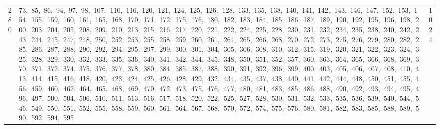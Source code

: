 \begin{longtable}{c|p{}|r}
280 & 73,\ 85,\ 86,\ 94,\ 97,\ 98,\ 107,\ 110,\ 116,\ 120,\ 121,\ 124,\ 125,\ 126,\ 128,\ 133,\ 135,\ 138,\ 140,\ 141,\ 142,\ 143,\ 146,\ 147,\ 152,\ 153,\ 154,\ 155,\ 159,\ 160,\ 161,\ 165,\ 168,\ 170,\ 171,\ 172,\ 175,\ 176,\ 180,\ 182,\ 183,\ 184,\ 185,\ 186,\ 187,\ 189,\ 190,\ 192,\ 195,\ 196,\ 198,\ 200,\ 203,\ 204,\ 205,\ 208,\ 209,\ 210,\ 213,\ 215,\ 216,\ 217,\ 220,\ 221,\ 222,\ 224,\ 225,\ 228,\ 230,\ 231,\ 232,\ 234,\ 235,\ 238,\ 240,\ 242,\ 243,\ 244,\ 245,\ 247,\ 248,\ 250,\ 252,\ 253,\ 255,\ 258,\ 259,\ 260,\ 261,\ 264,\ 265,\ 266,\ 268,\ 270,\ 272,\ 273,\ 275,\ 276,\ 279,\ 280,\ 282,\ 285,\ 286,\ 287,\ 288,\ 290,\ 292,\ 294,\ 295,\ 297,\ 299,\ 300,\ 301,\ 304,\ 305,\ 306,\ 308,\ 310,\ 312,\ 315,\ 319,\ 320,\ 321,\ 322,\ 323,\ 324,\ 325,\ 328,\ 329,\ 330,\ 332,\ 333,\ 335,\ 336,\ 340,\ 341,\ 342,\ 344,\ 345,\ 348,\ 350,\ 351,\ 352,\ 357,\ 360,\ 363,\ 364,\ 365,\ 366,\ 368,\ 369,\ 370,\ 371,\ 372,\ 374,\ 375,\ 376,\ 377,\ 378,\ 380,\ 384,\ 385,\ 387,\ 388,\ 390,\ 391,\ 392,\ 396,\ 399,\ 400,\ 403,\ 405,\ 406,\ 407,\ 408,\ 410,\ 413,\ 414,\ 415,\ 416,\ 418,\ 420,\ 423,\ 424,\ 425,\ 426,\ 428,\ 429,\ 432,\ 434,\ 435,\ 437,\ 438,\ 440,\ 441,\ 442,\ 444,\ 448,\ 450,\ 451,\ 455,\ 456,\ 459,\ 460,\ 462,\ 464,\ 465,\ 468,\ 469,\ 470,\ 472,\ 473,\ 475,\ 476,\ 477,\ 480,\ 481,\ 483,\ 485,\ 486,\ 488,\ 490,\ 492,\ 493,\ 494,\ 495,\ 496,\ 497,\ 500,\ 504,\ 506,\ 510,\ 511,\ 513,\ 516,\ 517,\ 518,\ 520,\ 522,\ 525,\ 527,\ 528,\ 530,\ 531,\ 532,\ 533,\ 535,\ 536,\ 539,\ 540,\ 544,\ 546,\ 549,\ 550,\ 551,\ 552,\ 555,\ 558,\ 559,\ 560,\ 561,\ 564,\ 567,\ 568,\ 570,\ 572,\ 574,\ 575,\ 576,\ 580,\ 581,\ 582,\ 583,\ 585,\ 588,\ 589,\ 590,\ 592,\ 594,\ 595 & 1024 \\

\end{longtable}
